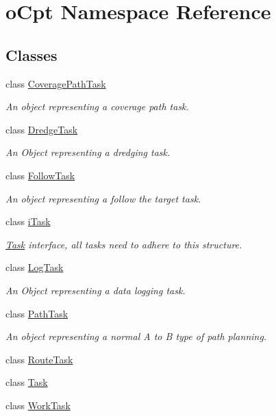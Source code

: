 \hypertarget{namespaceo_cpt}{}\section{o\+Cpt Namespace Reference}
\label{namespaceo_cpt}
\subsection*{Classes}
\begin{DoxyCompactItemize}
\item 
class \hyperlink{classo_cpt_1_1_coverage_path_task}{Coverage\+Path\+Task}
\begin{DoxyCompactList}\small\item\em An object representing a coverage path task. \end{DoxyCompactList}\item 
class \hyperlink{classo_cpt_1_1_dredge_task}{Dredge\+Task}
\begin{DoxyCompactList}\small\item\em An Object representing a dredging task. \end{DoxyCompactList}\item 
class \hyperlink{classo_cpt_1_1_follow_task}{Follow\+Task}
\begin{DoxyCompactList}\small\item\em An object representing a follow the target task. \end{DoxyCompactList}\item 
class \hyperlink{classo_cpt_1_1i_task}{i\+Task}
\begin{DoxyCompactList}\small\item\em \hyperlink{classo_cpt_1_1_task}{Task} interface, all tasks need to adhere to this structure. \end{DoxyCompactList}\item 
class \hyperlink{classo_cpt_1_1_log_task}{Log\+Task}
\begin{DoxyCompactList}\small\item\em An Object representing a data logging task. \end{DoxyCompactList}\item 
class \hyperlink{classo_cpt_1_1_path_task}{Path\+Task}
\begin{DoxyCompactList}\small\item\em An object representing a normal A to B type of path planning. \end{DoxyCompactList}\item 
class \hyperlink{classo_cpt_1_1_route_task}{Route\+Task}
\item 
class \hyperlink{classo_cpt_1_1_task}{Task}
\item 
class \hyperlink{classo_cpt_1_1_work_task}{Work\+Task}
\end{DoxyCompactItemize}
